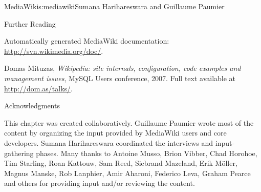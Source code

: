 \begin{aosachapter}{MediaWiki}{s:mediawiki}{Sumana Harihareswara and Guillaume Paumier}
\begin{aosasect1}{Further Reading}
\begin{aosaitemize}
\item Automatically generated MediaWiki documentation:
  \url{http://svn.wikimedia.org/doc/}.

\item Domas Mituzas, \emph{Wikipedia: site internals, configuration,
  code examples and management issues}, MySQL Users conference,
  2007. Full text available at \url{http://dom.as/talks/}.

\end{aosaitemize}

\end{aosasect1}

\begin{aosasect1}{Acknowledgments}

This chapter was created collaboratively. Guillaume Paumier wrote most
of the content by organizing the input provided by MediaWiki users and
core developers. Sumana Harihareswara coordinated the interviews and
input-gathering phases. Many thanks to Antoine Musso, Brion Vibber,
Chad Horohoe, Tim Starling, Roan Kattouw, Sam Reed, Siebrand Mazeland,
Erik M\"{o}ller, Magnus Manske, Rob Lanphier, Amir Aharoni, Federico Leva,
Graham Pearce and others for providing input and/or reviewing the
content.

\end{aosasect1}

\end{aosachapter}

